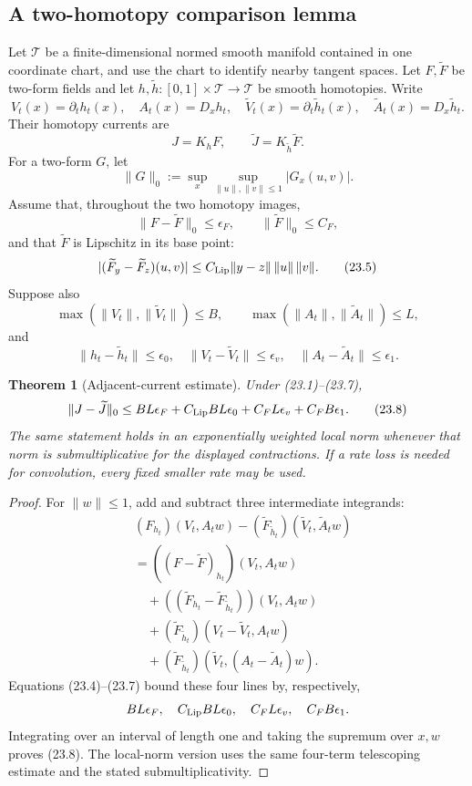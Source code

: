 \documentclass[11pt]{article}
\newtheorem{theorem}{Theorem}[section]
\begin{document}
\subsection{A two-homotopy comparison lemma}

Let \(\mathcal T\) be a finite-dimensional normed smooth manifold
contained in one coordinate chart, and use the chart to identify nearby
tangent spaces.  Let \(F,\widetilde F\) be two-form fields and let
\(h,\widetilde h:[0,1]\times\mathcal T\to\mathcal T\) be smooth
homotopies.  Write
\[
 V_t(x)=\partial_t h_t(x),\quad
 A_t(x)=D_xh_t,\quad
 \widetilde V_t(x)=\partial_t\widetilde h_t(x),\quad
 \widetilde A_t(x)=D_x\widetilde h_t.
 \tag{23.1}
\]
Their homotopy currents are
\[
 J=K_hF,\qquad \widetilde J=K_{\widetilde h}\widetilde F.
 \tag{23.2}
\]
For a two-form \(G\), let
\[
 \|G\|_0:=\sup_{x}\sup_{\|u\|,\|v\|\leq1}|G_x(u,v)|.
 \tag{23.3}
\]
Assume that, throughout the two homotopy images,
\[
 \|F-\widetilde F\|_0\leq\epsilon_F,\qquad
 \|\widetilde F\|_0\leq C_F,
 \tag{23.4}
\]
and that \(\widetilde F\) is Lipschitz in its base point:
\[
 |(\widetilde F_y-\widetilde F_z)(u,v)|
 \leq C_{\rm Lip}\|y-z\|\,\|u\|\,\|v\|.
 \tag{23.5}
\]
Suppose also
\[
 \max(\|V_t\|,\|\widetilde V_t\|)\leq B,\qquad
 \max(\|A_t\|,\|\widetilde A_t\|)\leq L,
 \tag{23.6}
\]
and
\[
 \|h_t-\widetilde h_t\|\leq\epsilon_0,\quad
 \|V_t-\widetilde V_t\|\leq\epsilon_v,\quad
 \|A_t-\widetilde A_t\|\leq\epsilon_1.
 \tag{23.7}
\]

\begin{theorem}[Adjacent-current estimate]
\label{thm:v11v23-current-estimate}
Under (23.1)--(23.7),
\[
 \|J-\widetilde J\|_0
 \leq
 BL\epsilon_F
 +C_{\rm Lip}BL\epsilon_0
 +C_FL\epsilon_v
 +C_FB\epsilon_1.
 \tag{23.8}
\]
The same statement holds in an exponentially weighted local norm whenever
that norm is submultiplicative for the displayed contractions.  If a
rate loss is needed for convolution, every fixed smaller rate may be
used.
\end{theorem}

\begin{proof}
For \(\|w\|\leq1\), add and subtract three intermediate integrands:
\begin{align*}
 &(F_{h_t})(V_t,A_tw)
 -(\widetilde F_{\widetilde h_t})(\widetilde V_t,\widetilde A_tw)\\
 &=
 ((F-\widetilde F)_{h_t})(V_t,A_tw)\\
 &\quad+
 ((\widetilde F_{h_t}-\widetilde F_{\widetilde h_t}))
       (V_t,A_tw)\\
 &\quad+
 (\widetilde F_{\widetilde h_t})
       (V_t-\widetilde V_t,A_tw)\\
 &\quad+
 (\widetilde F_{\widetilde h_t})
       (\widetilde V_t,(A_t-\widetilde A_t)w).
\end{align*}
Equations (23.4)--(23.7) bound these four lines by, respectively,
\[
 BL\epsilon_F,\quad
 C_{\rm Lip}BL\epsilon_0,\quad
 C_FL\epsilon_v,\quad
 C_FB\epsilon_1.
\]
Integrating over an interval of length one and taking the supremum over
\(x,w\) proves (23.8).  The local-norm version uses the same four-term
telescoping estimate and the stated submultiplicativity.
\end{proof}
\end{document}
